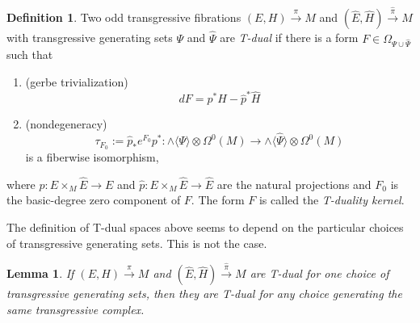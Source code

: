 \documentclass[12pt,twoside]{article}
\theoremstyle{plain}
\newtheorem{lemma}[theorem]{Lemma}%
\theoremstyle{definition}
\newtheorem{definition}[theorem]{Definition}
\newcommand{\tensor}{\otimes}
\newcommand{\IP}[1]{\langle #1 \rangle}
\numberwithin{equation}{section}
\begin{document}
\begin{definition}\label{def:T-duality}
Two odd transgressive fibrations $(E,H)\stackrel{\pi}{\longrightarrow} M$ and $(\hat{E},\hat{H})\stackrel{\hat\pi}{\longrightarrow} M$ with transgressive generating sets $\Psi$ and $\hat\Psi$ are \emph{T-dual} if there is a form $F \in \Omega_{\Psi\cup\hat{\Psi}}$ such that
\begin{enumerate}
\item (gerbe trivialization)
\[dF = p^*H - \hat{p}^*\hat{H}\]
\item (nondegeneracy)\[\tau_{F_0}:= \hat{p}_*e^{F_0}p^*\colon \wedge \IP{\Psi} \tensor \Omega^0(M)   \to  \wedge \IP{\hat\Psi}\tensor \Omega^0(M)\]
 is a fiberwise isomorphism,
\end{enumerate}
where $p\colon E \times _M\hat{E}\to E$ and $\hat{p}\colon E \times _M\hat{E}\to \hat{E}$ are the natural projections and $F_0$ is the basic-degree zero component of $F$. The form $F$ is called the \emph{T-duality kernel}.
\end{definition}
The definition of T-dual spaces above seems to depend on the particular choices of  transgressive generating sets. This is not the case.
\begin{lemma}
If $(E,H)\stackrel{\pi}{\longrightarrow} M$ and $(\hat{E},\hat{H})\stackrel{\hat\pi}{\longrightarrow} M$ are T-dual for one choice of transgressive generating sets, then they are T-dual for any choice generating the same transgressive complex.
\end{lemma}
\end{document}
